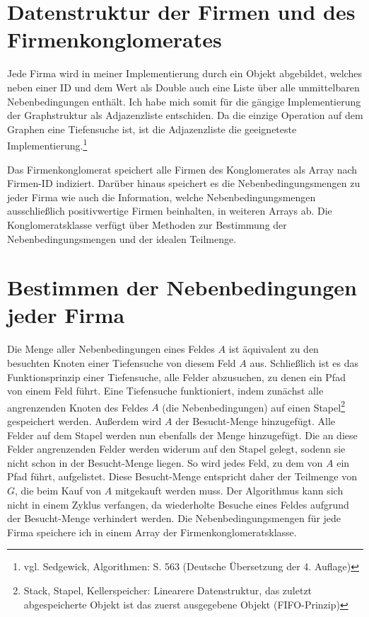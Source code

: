 \section{Datenstruktur der Firmen und des Firmenkonglomerates}
Jede Firma wird in meiner Implementierung durch ein Objekt abgebildet, welches neben einer ID und dem Wert als Double auch eine Liste über alle unmittelbaren Nebenbedingungen enthält. Ich habe mich somit für die gängige Implementierung der Graphstruktur als Adjazenzliste entschiden. Da die einzige Operation auf dem Graphen eine Tiefensuche ist, ist die Adjazenzliste die geeigneteste Implementierung.\footnote{vgl. Sedgewick, Algorithmen: S. 563 (Deutsche Übersetzung der 4. Auflage)}

Das Firmenkonglomerat speichert alle Firmen des Konglomerates als Array nach Firmen-ID indiziert. Darüber hinaus speichert es die Nebenbedingungsmengen zu jeder Firma wie auch die Information, welche Nebenbedingungsmengen ausschließlich positivwertige Firmen beinhalten, in weiteren Arrays ab. Die Konglomeratsklasse verfügt über Methoden zur Bestimmung der Nebenbedingungsmengen und der idealen Teilmenge.

\section{Bestimmen der Nebenbedingungen jeder Firma}
Die Menge aller Nebenbedingungen eines Feldes \(A\) ist äquivalent zu den besuchten Knoten einer Tiefensuche von diesem Feld \(A\) aus. Schließlich ist es das Funktionsprinzip einer Tiefensuche, alle Felder abzusuchen, zu denen ein Pfad von einem Feld führt. Eine Tiefensuche funktioniert, indem zunächst alle angrenzenden Knoten des Feldes \(A\) (die Nebenbedingungen) auf einen Stapel\footnote{Stack, Stapel, Kellerspeicher: Linearere Datenstruktur, das zuletzt abgespeicherte Objekt ist das zuerst ausgegebene Objekt (FIFO-Prinzip)} gespeichert werden.
Außerdem wird \(A\) der Besucht-Menge hinzugefügt. Alle Felder auf dem Stapel werden nun ebenfalls der Menge hinzugefügt. Die an diese Felder angrenzenden Felder werden widerum auf den Stapel gelegt, sodenn sie nicht schon in der Besucht-Menge liegen. So wird jedes Feld, zu dem von \(A\) ein Pfad führt, aufgelistet. Diese Besucht-Menge entspricht daher der Teilmenge von \(G\), die beim Kauf von \(A\) mitgekauft werden muss. Der Algorithmus kann sich nicht in einem Zyklus verfangen, da wiederholte Besuche eines Feldes aufgrund der Besucht-Menge verhindert werden. Die Nebenbedingungsmengen für jede Firma speichere ich in einem Array der Firmenkonglomeratsklasse.

